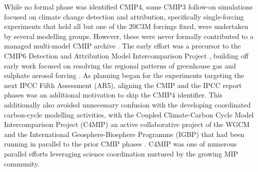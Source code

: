 \documentclass[gmd, preprint]{copernicus}
\newcommand{\mycomment}[1]{}
\begin{document}
While no formal phase was identified CMIP4, some CMIP3 follow-on simulations focused on climate change detection and attribution, specifically single-forcing experiments that held all but one of the 20C3M forcings fixed, were undertaken by several modelling groups. However, these were never formally contributed to a managed multi-model CMIP archive \citep{stouffer_cmip5_2017}. The early effort was a precursor to the CMIP6 Detection and Attribution Model Intercomparison Project \citep[DAMIP;][]{gillett_detection_2016}, building off early work focused on resolving the regional patterns of greenhouse gas and sulphate aerosol forcing \citep{taylor_response_1994, santer_towards_1995, hegerl_optimal_2000, gillett_detecting_2002, hegerl_20c3m_2003}. As planning began for the experiments targeting the next IPCC Fifth Assessment (AR5), aligning the CMIP and the IPCC report phases was an additional motivation to skip the CMIP4 identifier. This additionally also avoided unnecessary confusion with the developing coordinated carbon-cycle modelling activities, with the Coupled Climate-Carbon Cycle Model Intercomparison Project (C4MIP) an active collaborative project of the WGCM and the International Geosphere-Biosphere Programme (IGBP) that had been running in parallel to the prior CMIP phases \citep{fung_full-form_2000, cox_modelling_2002, friedlingstein_climatecarbon_2006}. C4MIP was one of numerous parallel efforts leveraging science coordination nurtured by the growing MIP community.
\mycomment{
CMIP4 comment - https://www.wcrp-climate.org/images/modelling/WGCM/WGCM17/WGCM17_report.pdf#Page=8
}
\end{document}
